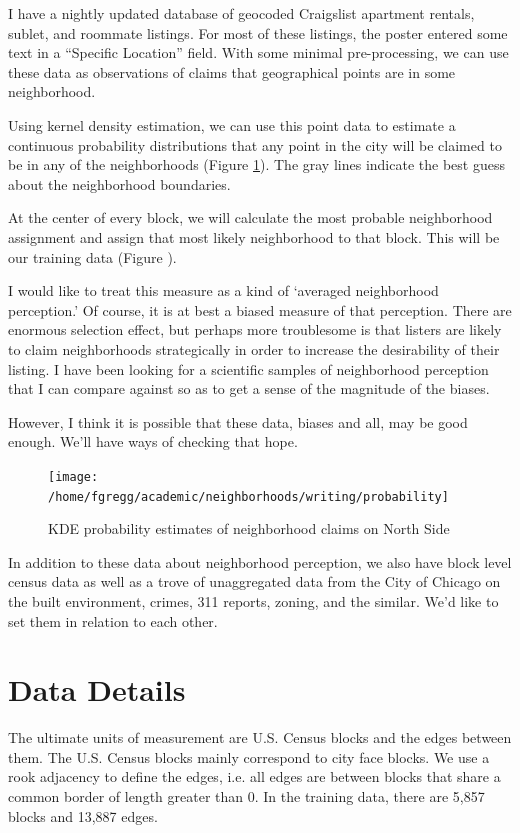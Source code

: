 \documentclass[12pt,letter]{article}\usepackage[]{graphicx}\usepackage[]{color}
\begin{document}
I have a nightly updated database of geocoded Craigslist apartment
rentals, sublet, and roommate listings. For most of these listings,
the poster entered some text in a ``Specific Location'' field. With
some minimal pre-processing, we can use these data as observations of
claims that geographical points are in some neighborhood.

Using kernel density estimation, we can use this point data to
estimate a continuous probability distributions that any point in the
city will be claimed to be in any of the neighborhoods (Figure
\ref{fig:KDE}). The gray lines indicate the best guess about the
neighborhood boundaries.

At the center of every block, we will calculate the most probable
neighborhood assignment and assign that most likely neighborhood to
that block. This will be our training data (Figure ).

I would like to treat this measure as a kind of `averaged
neighborhood perception.' Of course, it is at best a biased measure of
that perception. There are enormous selection effect, but perhaps more
troublesome is that listers are likely to claim neighborhoods
strategically in order to increase the desirability of their
listing. I have been looking for a scientific samples of neighborhood
perception that I can compare against so as to get a sense of the
magnitude of the biases. 

However, I think it is possible that these data, biases and all, may
be good enough. We'll have ways of checking that hope.


\begin{figure}
\texttt{[image: /home/fgregg/academic/neighborhoods/writing/probability]}
\caption{KDE probability estimates of neighborhood claims on North Side}
\label{fig:KDE}
\end{figure}

In addition to these data about neighborhood perception, we also have
block level census data as well as a trove of unaggregated data from
the City of Chicago on the built environment, crimes, 311 reports,
zoning, and the similar. We'd like to set them in relation to each
other.

\section*{Data Details}
The ultimate units of measurement are U.S. Census blocks and the edges
between them. The U.S. Census blocks mainly correspond to city face blocks.
We use a rook adjacency to define the edges, i.e. all edges are between blocks
that share a common border of length greater than 0. In the training data,
there are 5,857 blocks and
  13,887 edges.
\end{document}
